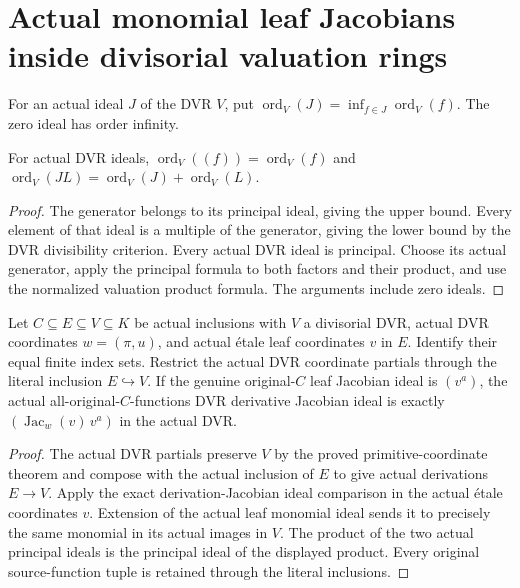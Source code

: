 \section{Actual monomial leaf Jacobians inside divisorial valuation rings}

\begin{definition}\label{def:sc0-dvr-ideal-order}
\leanok
For an actual ideal $J$ of the DVR $V$, put
$\operatorname{ord}_V(J)=\inf_{f\in J}\operatorname{ord}_V(f)$.
The zero ideal has order infinity.
\end{definition}

\begin{lemma}\label{lem:sc0-dvr-ideal-order-principal-product}
\leanok
{}
For actual DVR ideals, $\operatorname{ord}_V((f))=\operatorname{ord}_V(f)$
and $\operatorname{ord}_V(JL)=\operatorname{ord}_V(J)+\operatorname{ord}_V(L)$.
\end{lemma}
\begin{proof}
The generator belongs to its principal ideal, giving the upper bound.
Every element of that ideal is a multiple of the generator, giving the
lower bound by the DVR divisibility criterion. Every actual DVR ideal is
principal. Choose its actual generator, apply the principal formula to both
factors and their product, and use the normalized valuation product formula.
The arguments include zero ideals.
\end{proof}

\begin{theorem}\label{thm:sc0-dvr-leaf-source-jacobian}
\leanok
{}
Let $C\subseteq E\subseteq V\subseteq K$ be actual inclusions with $V$
a divisorial DVR, actual DVR coordinates $w=(\pi,u)$, and actual \'etale
leaf coordinates $v$ in $E$. Identify their equal finite index sets.
Restrict the actual DVR coordinate partials through the literal inclusion
$E\hookrightarrow V$. If the genuine original-$C$ leaf Jacobian ideal is
$(v^a)$, the actual all-original-$C$-functions DVR derivative Jacobian ideal
is exactly $(\operatorname{Jac}_w(v)\,v^a)$ in the actual DVR.
\end{theorem}
\begin{proof}
The actual DVR partials preserve $V$ by the proved primitive-coordinate
theorem and compose with the actual inclusion of $E$ to give actual
derivations $E\to V$. Apply the exact derivation-Jacobian ideal comparison
in the actual \'etale coordinates $v$. Extension of the actual leaf monomial
ideal sends it to precisely the same monomial in its actual images in $V$.
The product of the two actual principal ideals is the principal ideal of
the displayed product. Every original source-function tuple is retained
through the literal inclusions.
\end{proof}

